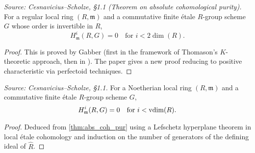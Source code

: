 \begin{theorem}
  \label{thm:abs_coh_pur}
  \textit{Source: Cesnavicius--Scholze, §1.1 (Theorem on absolute cohomological purity).}
  For a regular local ring \((R, \mathfrak{m})\) and a commutative finite étale \(R\)-group scheme \(G\) whose order is invertible in \(R\),
  \[
    H^i_{\mathfrak{m}}(R, G) = 0 \quad \text{for } i < 2\dim(R).
  \]
\end{theorem}

\begin{proof}
  \uses{}
  This is proved by Gabber (first in the framework of Thomason's \(K\)-theoretic approach, then in \cite{ILO14}). The paper gives a new proof reducing to positive characteristic via perfectoid techniques.
\end{proof}

\begin{theorem}
  \label{thm:ell_semipurity}
  \textit{Source: Cesnavicius--Scholze, §1.1.}
  For a Noetherian local ring \((R, \mathfrak{m})\) and a commutative finite étale \(R\)-group scheme \(G\),
  \[
    H^i_{\mathfrak{m}}(R, G) = 0 \quad \text{for } i < \operatorname{vdim}(R).
  \]
\end{theorem}

\begin{proof}
  Deduced from \cref{thm:abs_coh_pur} using a Lefschetz hyperplane theorem in local étale cohomology and induction on the number of generators of the defining ideal of \(\widehat{R}\).
\end{proof}


